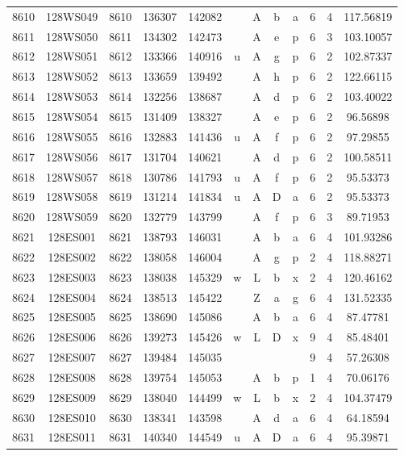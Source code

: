 \begin{tabular}{|*{12}{c|}}
8610 & 128WS049 & 8610 & 136307 & 142082 &  & A & b & a & 6 & 4 & 117.56819 \\ 
8611 & 128WS050 & 8611 & 134302 & 142473 &  & A & e & p & 6 & 3 & 103.10057 \\ 
8612 & 128WS051 & 8612 & 133366 & 140916 & u & A & g & p & 6 & 2 & 102.87337 \\ 
8613 & 128WS052 & 8613 & 133659 & 139492 &  & A & h & p & 6 & 2 & 122.66115 \\ 
8614 & 128WS053 & 8614 & 132256 & 138687 &  & A & d & p & 6 & 2 & 103.40022 \\ 
8615 & 128WS054 & 8615 & 131409 & 138327 &  & A & e & p & 6 & 2 & 96.56898 \\ 
8616 & 128WS055 & 8616 & 132883 & 141436 & u & A & f & p & 6 & 2 & 97.29855 \\ 
8617 & 128WS056 & 8617 & 131704 & 140621 &  & A & d & p & 6 & 2 & 100.58511 \\ 
8618 & 128WS057 & 8618 & 130786 & 141793 & u & A & f & p & 6 & 2 & 95.53373 \\ 
8619 & 128WS058 & 8619 & 131214 & 141834 & u & A & D & a & 6 & 2 & 95.53373 \\ 
8620 & 128WS059 & 8620 & 132779 & 143799 &  & A & f & p & 6 & 3 & 89.71953 \\ 
8621 & 128ES001 & 8621 & 138793 & 146031 &  & A & b & a & 6 & 4 & 101.93286 \\ 
8622 & 128ES002 & 8622 & 138058 & 146004 &  & A & g & p & 2 & 4 & 118.88271 \\ 
8623 & 128ES003 & 8623 & 138038 & 145329 & w & L & b & x & 2 & 4 & 120.46162 \\ 
8624 & 128ES004 & 8624 & 138513 & 145422 &  & Z & a & g & 6 & 4 & 131.52335 \\ 
8625 & 128ES005 & 8625 & 138690 & 145086 &  & A & b & a & 6 & 4 & 87.47781 \\ 
8626 & 128ES006 & 8626 & 139273 & 145426 & w & L & D & x & 9 & 4 & 85.48401 \\ 
8627 & 128ES007 & 8627 & 139484 & 145035 &  &  &  &  & 9 & 4 & 57.26308 \\ 
8628 & 128ES008 & 8628 & 139754 & 145053 &  & A & b & p & 1 & 4 & 70.06176 \\ 
8629 & 128ES009 & 8629 & 138040 & 144499 & w & L & b & x & 2 & 4 & 104.37479 \\ 
8630 & 128ES010 & 8630 & 138341 & 143598 &  & A & d & a & 6 & 4 & 64.18594 \\ 
8631 & 128ES011 & 8631 & 140340 & 144549 & u & A & D & a & 6 & 4 & 95.39871 \\ 

\end{tabular}
